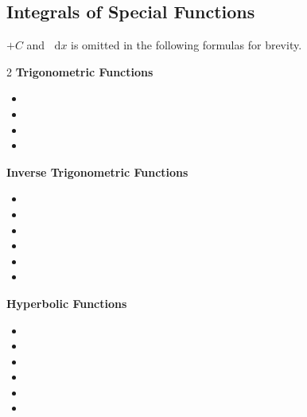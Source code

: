 \documentclass[a4paper,12pt]{article}
\newcommand{\key}[1]{\textcolor{keywordcolor}{\textbf{#1}}}
\renewcommand{\d}{\mathop{}\!\mathrm{d}}
\begin{document}
\subsection{Integrals of Special Functions}
$+C$ and $\d x$ is omitted in the following formulas for brevity.
\begin{multicols}{2}
    \noindent\key{Trigonometric Functions}
    \begin{itemize}[leftmargin=*]
        \item {}
        \item {}
        \item {}
        \item {}
    \end{itemize}

    \noindent\key{Inverse Trigonometric Functions}
    \begin{itemize}[leftmargin=*]
        \item {}
        \item {}
        \item {}
        \item {}
        \item {}
        \item {}
    \end{itemize}
    
    \noindent\key{Hyperbolic Functions}
    \begin{itemize}[leftmargin=*]
       \item {}
       \item {}
       \item {}
       \item {}
       \item {}
       \item {}
    \end{itemize}


\end{multicols}
\end{document}
